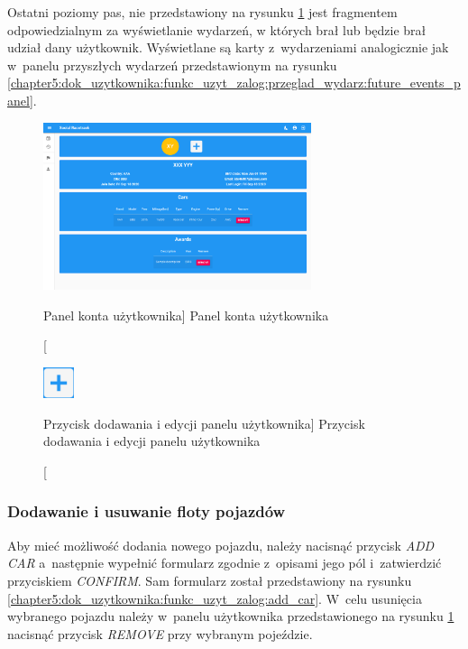 \documentclass[../Kamil_Kowalewski_Main.tex]{subfiles}
\begin{document}
{{{            Ostatni poziomy pas, nie przedstawiony na rysunku
            \ref{chapter5:dok_uzytkownika:funkc_uzyt_zalog:user_panel} jest fragmentem
            odpowiedzialnym za wyświetlanie wydarzeń, w których brał lub będzie brał
            udział dany użytkownik. Wyświetlane są karty z~wydarzeniami analogicznie
            jak w~panelu przyszłych wydarzeń przedstawionym na rysunku
            \ref{chapter5:dok_uzytkownika:funkc_uzyt_zalog:przeglad_wydarz:future_events_panel}.

            \begin{figure}[H]
                \centering
                \includegraphics[width=0.7\textwidth, keepaspectratio]
                {img/chapter5/loggedin/user_panel.png}
                \caption
                [Panel konta użytkownika]
                {Panel konta użytkownika}
                \label{chapter5:dok_uzytkownika:funkc_uzyt_zalog:user_panel}
            \end{figure}

            \begin{figure}[H]
                \centering
                \includegraphics[width=0.08\textwidth, keepaspectratio]
                {img/chapter5/loggedin/add_button.png}
                \caption
                [Przycisk dodawania i edycji panelu użytkownika]
                {Przycisk dodawania i edycji panelu użytkownika}
                \label{chapter5:dok_uzytkownika:funkc_uzyt_zalog:add_button}
            \end{figure}

            \subsubsection{Dodawanie i usuwanie floty pojazdów}
            \label{chapter5:dok_uzytkownika:funkc_uzyt_zalog:konto_uzyt:dod_usun_samochod} {
                Aby mieć możliwość dodania nowego pojazdu, należy nacisnąć przycisk
                \textit{ADD CAR} a~następnie wypełnić formularz zgodnie z~opisami jego
                pól i~zatwierdzić przyciskiem \textit{CONFIRM}. Sam formularz został
                przedstawiony na rysunku
                \ref{chapter5:dok_uzytkownika:funkc_uzyt_zalog:add_car}. W~celu
                usunięcia wybranego pojazdu należy w~panelu użytkownika przedstawionego
                na rysunku \ref{chapter5:dok_uzytkownika:funkc_uzyt_zalog:user_panel}
                nacisnąć przycisk \textit{REMOVE} przy wybranym pojeździe.

}}}}
\end{document}
